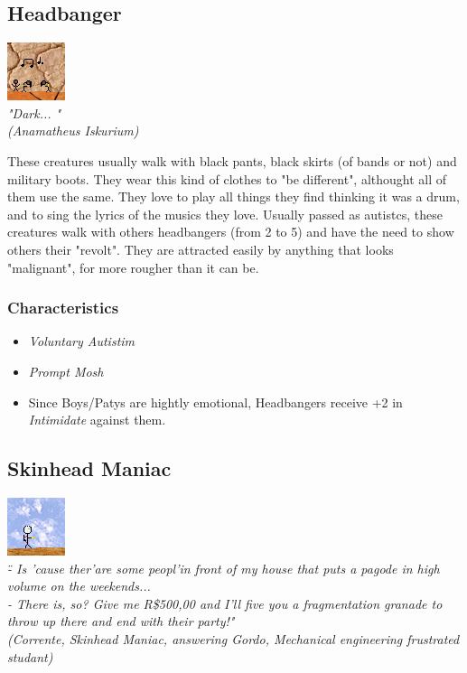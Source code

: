 \documentclass[ letterpaper,12pt]{article}
\begin{document}
\subsection{Headbanger}
\includegraphics{../data/races/Img/metaleiro.png}\\
{\it "Dark... "\\
(Anamatheus Iskurium)\\}

These creatures usually walk with black pants, black skirts (of bands or not)
and military boots. They wear this kind of clothes to "be different", althought
all of them use the same. They love to play all things they find thinking it
was a drum, and to sing the lyrics of the musics they love. Usually passed as
autistcs, these creatures walk with others headbangers (from 2 to 5) and have
the need to show others their "revolt". They are attracted easily by anything
that looks "malignant", for more rougher than it can be.

\subsubsection{Characteristics}
\begin{itemize}
\item{{\it Voluntary Autistim}}
\item{{\it Prompt Mosh}}
\item{Since Boys/Patys are hightly emotional, Headbangers receive +2 in {\it Intimidate} against them.}
\end{itemize}

\subsection{Skinhead Maniac}
\includegraphics{../data/races/Img/skin.png}\\
{\it \" - Is 'cause ther'are some peopl'in front of my house that puts a pagode in high volume on the weekends...\\
 - There is, so? Give me R\$500,00 and I'll five you a fragmentation granade to throw up there and end with their party!"\\
(Corrente, Skinhead Maniac, answering Gordo, Mechanical engineering frustrated studant)}\\
\end{document}
